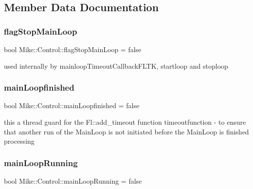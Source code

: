 \subsection{Member Data Documentation}
\mbox{\label{class_mike_1_1_control_a800d1dc7b58dc3af7c081225009c898f}} 
\subsubsection{\texorpdfstring{flag\+Stop\+Main\+Loop}{flagStopMainLoop}}
{\footnotesize\ttfamily bool Mike\+::\+Control\+::flag\+Stop\+Main\+Loop = false\hspace{0.3cm}{\ttfamily [private]}}

used internally by mainloop\+Timeout\+Callback\+F\+L\+TK, startloop and stoploop \mbox{\label{class_mike_1_1_control_a7749b97976e1bb3e7ea49c7d63531dfc}} 
\subsubsection{\texorpdfstring{main\+Loopfinished}{mainLoopfinished}}
{\footnotesize\ttfamily bool Mike\+::\+Control\+::main\+Loopfinished = false\hspace{0.3cm}{\ttfamily [private]}}

this a \textquotesingle{}thread guard\textquotesingle{} for the Fl\+::add\+\_\+timeout function timeoutfunction -\/ to ensure that another run of the Main\+Loop is not initiated before the Main\+Loop is finished processing \mbox{\label{class_mike_1_1_control_af17a58f80bda54fda5b0a5167c8f04ed}} 
\subsubsection{\texorpdfstring{main\+Loop\+Running}{mainLoopRunning}}
{\footnotesize\ttfamily bool Mike\+::\+Control\+::main\+Loop\+Running = false\hspace{0.3cm}{\ttfamily [private]}}

